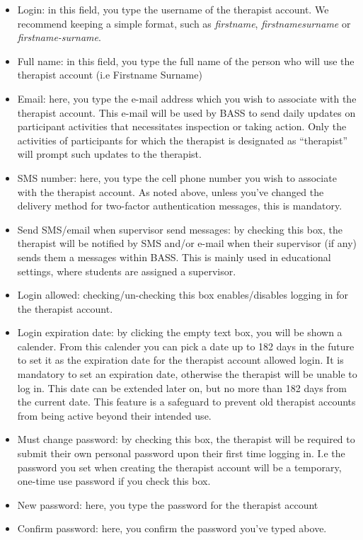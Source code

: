 \documentclass[
]{book}
\providecommand{\tightlist}{%
  \setlength{\itemsep}{0pt}\setlength{\parskip}{0pt}}
\begin{document}
\begin{itemize}
\tightlist
\item
  Login: in this field, you type the username of the therapist account. We recommend keeping a simple format, such as \emph{firstname}, \emph{firstnamesurname} or \emph{firstname-surname}.
\item
  Full name: in this field, you type the full name of the person who will use the therapist account (i.e Firstname Surname)
\item
  Email: here, you type the e-mail address which you wish to associate with the therapist account. This e-mail will be used by BASS to send daily updates on participant activities that necessitates inspection or taking action. Only the activities of participants for which the therapist is designated as ``therapist'' will prompt such updates to the therapist.
\item
  SMS number: here, you type the cell phone number you wish to associate with the therapist account. As noted above, unless you've changed the delivery method for two-factor authentication messages, this is mandatory.
\item
  Send SMS/email when supervisor send messages: by checking this box, the therapist will be notified by SMS and/or e-mail when their supervisor (if any) sends them a messages within BASS. This is mainly used in educational settings, where students are assigned a supervisor.
\item
  Login allowed: checking/un-checking this box enables/disables logging in for the therapist account.
\item
  Login expiration date: by clicking the empty text box, you will be shown a calender. From this calender you can pick a date up to 182 days in the future to set it as the expiration date for the therapist account allowed login. It is mandatory to set an expiration date, otherwise the therapist will be unable to log in. This date can be extended later on, but no more than 182 days from the current date. This feature is a safeguard to prevent old therapist accounts from being active beyond their intended use.
\item
  Must change password: by checking this box, the therapist will be required to submit their own personal password upon their first time logging in. I.e the password you set when creating the therapist account will be a temporary, one-time use password if you check this box.
\item
  New password: here, you type the password for the therapist account
\item
  Confirm password: here, you confirm the password you've typed above.
\end{itemize}
\end{document}
